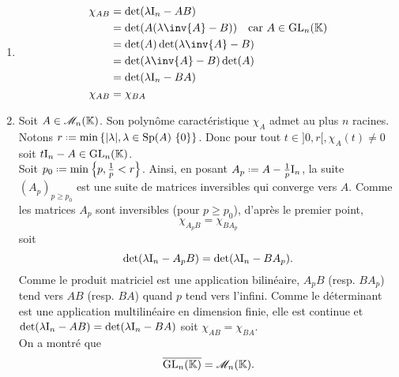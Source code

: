 \begin{solution}
    \begin{enumerate}
        \item \begin{align*}
        \chi_{AB} &= \det(\lambda \I_n - AB) \\
        &= \det(A(\lambda \inv{A} - B)) \quad \text{car } A \in \Gl_n(\K) \\
        &= \det(A) \det(\lambda \inv{A} - B) \\
        &= \det(\lambda \inv{A} - B) \det(A) \\
        &= \det(\lambda \I_n - BA) \\
        \chi_{AB} &= \chi_{BA}
    \end{align*}
    \item Soit $A \in \mathscr{M}_n(\mathbb{K})$. Son polynôme caractéristique $\chi_A$ admet au plus $n$ racines. \\
    Notons $r \defeq \min \left\{ |\lambda|, \lambda \in \Sp(A) \ \{0\} \right\}$. Donc pour tout $t \in ]0,r[, \chi_A(t) \not=0$ soit $t \mathrm{I}_n - A \in \mathrm{GL}_n(\mathbb{K})$. \\
    Soit $p_0 \defeq \min \left\{ p, \frac{1}{p} < r \right\}$. Ainsi, en posant $A_p \defeq A - \frac{1}{p} \I_n$, la suite $(A_p)_{p \geqslant p_0}$ est une suite de matrices inversibles qui converge vers $A$. Comme les matrices $A_p$ sont inversibles (pour $p \geqslant p_0$), d'après le premier point, 
    $$\chi_{A_p B} = \chi_{B A_p}$$
    soit 
    $$\det(\lambda \mathrm{I}_n - A_p B) = \det(\lambda \mathrm{I}_n - B A_p).$$
    Comme le produit matriciel est une application bilinéaire, $A_p B$ (resp. $B A_p$) tend vers $AB$ (resp. $BA$) quand $p$ tend vers l'infini. Comme le déterminant est une application multilinéaire en dimension finie, elle est continue et $\det(\lambda \mathrm{I}_n - A B) = \det(\lambda \mathrm{I}_n - B A)$ soit $\chi_{A B} = \chi_{B A}$. \\
    On a montré que 
    $$\overline{\mathrm{GL}_n(\mathbb{K})} = \mathscr{M}_n(\mathbb{K}).$$
    \end{enumerate}
\end{solution}